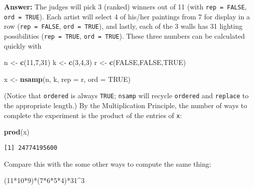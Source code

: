 \documentclass[]{book}
\newenvironment{Shaded}{\begin{snugshade}}{\end{snugshade}}
\newcommand{\KeywordTok}[1]{\textcolor[rgb]{0.13,0.29,0.53}{\textbf{{#1}}}}
\newcommand{\DataTypeTok}[1]{\textcolor[rgb]{0.13,0.29,0.53}{{#1}}}
\newcommand{\DecValTok}[1]{\textcolor[rgb]{0.00,0.00,0.81}{{#1}}}
\newcommand{\StringTok}[1]{\textcolor[rgb]{0.31,0.60,0.02}{{#1}}}
\newcommand{\OtherTok}[1]{\textcolor[rgb]{0.56,0.35,0.01}{{#1}}}
\newcommand{\NormalTok}[1]{{#1}}
\numberwithin{equation}{chapter}
\numberwithin{figure}{chapter}
\theoremstyle{plain}
\theoremstyle{definition}
\theoremstyle{remark}
\theoremstyle{definition}
\theoremstyle{definition}
\theoremstyle{remark}
\begin{document}
\textbf{Answer:} The judges will pick 3 (ranked) winners out of 11 (with
\texttt{rep\ =\ FALSE}, \texttt{ord\ =\ TRUE}). Each artist will select
4 of his/her paintings from 7 for display in a row
(\texttt{rep\ =\ FALSE}, \texttt{ord\ =\ TRUE}), and lastly, each of the
3 walls has 31 lighting possibilities (\texttt{rep\ =\ TRUE},
\texttt{ord\ =\ TRUE}). These three numbers can be calculated quickly
with

\begin{Shaded}
\begin{Highlighting}[]
\NormalTok{n <-}\StringTok{ }\KeywordTok{c}\NormalTok{(}\DecValTok{11}\NormalTok{,}\DecValTok{7}\NormalTok{,}\DecValTok{31}\NormalTok{) }
\NormalTok{k <-}\StringTok{ }\KeywordTok{c}\NormalTok{(}\DecValTok{3}\NormalTok{,}\DecValTok{4}\NormalTok{,}\DecValTok{3}\NormalTok{) }
\NormalTok{r <-}\StringTok{ }\KeywordTok{c}\NormalTok{(}\OtherTok{FALSE}\NormalTok{,}\OtherTok{FALSE}\NormalTok{,}\OtherTok{TRUE}\NormalTok{) }
\end{Highlighting}
\end{Shaded}

\begin{Shaded}
\begin{Highlighting}[]
\NormalTok{x <-}\StringTok{ }\KeywordTok{nsamp}\NormalTok{(n, k, }\DataTypeTok{rep =} \NormalTok{r, }\DataTypeTok{ord =} \OtherTok{TRUE}\NormalTok{) }
\end{Highlighting}
\end{Shaded}

(Notice that \texttt{ordered} is always \texttt{TRUE}; \texttt{nsamp}
will recycle \texttt{ordered} and \texttt{replace} to the appropriate
length.) By the Multiplication Principle, the number of ways to complete
the experiment is the product of the entries of \texttt{x}:

\begin{Shaded}
\begin{Highlighting}[]
\KeywordTok{prod}\NormalTok{(x) }
\end{Highlighting}
\end{Shaded}

\begin{verbatim}
[1] 24774195600
\end{verbatim}

Compare this with the some other ways to compute the same thing:

\begin{Shaded}
\begin{Highlighting}[]
\NormalTok{(}\DecValTok{11}\NormalTok{*}\DecValTok{10}\NormalTok{*}\DecValTok{9}\NormalTok{)*(}\DecValTok{7}\NormalTok{*}\DecValTok{6}\NormalTok{*}\DecValTok{5}\NormalTok{*}\DecValTok{4}\NormalTok{)*}\DecValTok{31}\NormalTok{^}\DecValTok{3} 
\end{Highlighting}
\end{Shaded}
\end{document}

